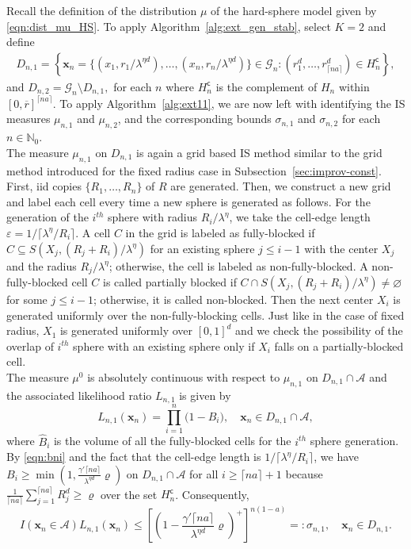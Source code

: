 \documentclass[11pt]{article}
\newcommand{\rbdd}{\overline{r}}
\newcommand{\mbb}{\mathbb}
\newcommand{\lt}{\left}
\newcommand{\rt}{\right}
\newcommand{\wh}{\widehat}
\newcommand{\lfs}{\mathbf{x}}
\begin{document}
Recall the definition of the distribution $\mu$ of the hard-sphere model given by \eqref{eqn:dist_mu_HS}.
To apply Algorithm~\ref{alg:ext_gen_stab}, select $K = 2$ and define
\begin{align*}
 D_{n,1} = \lt\{ \lfs_n = \{(x_1, r_1/\lambda^{\eta d}), \dots, (x_n, r_n/\lambda^{\eta d}) \} \in \mathscr{G}_n: (r_1^d, \dots, r^d_{\lceil n a \rceil}) \in H^{\mathsf{c}}_n\rt\},
\end{align*}
and $D_{n,2} =  {\mathscr{G}}_n\setminus D_{n,1},$
 for each $n$ where $H^{\mathsf{c}}_n$ is the complement of $H_n$ within $[0, \rbdd]^{\lceil n a \rceil}$. To apply Algorithm~\ref{alg:ext11}, we are now left with identifying the IS measures $\mu_{n,1}$ and $\mu_{n,2}$, and the corresponding bounds $\sigma_{n,1}$ and $\sigma_{n,2}$ for each ${n \in \mbb{N}_0}$. \\
 

The measure $\mu_{n,1}$  on $ D_{n,1}$ is again a grid based IS method similar to the grid method introduced for the fixed radius case in Subsection~\ref{sec:improv-const}. First, iid copies $\{R_1, \dots, R_n\}$ of $R$ are generated. Then, we construct a new grid and label each cell every time a new sphere is generated as follows. For the generation of the $i^{th}$ sphere with radius $R_i/\lambda^\eta$, we take the cell-edge length ${\varepsilon = 1/ \lceil \lambda^\eta/R_i\rceil}$. A cell $C$ in the grid is labeled as fully-blocked if ${C \subseteq S(X_j, (R_j + R_i)/\lambda^\eta)}$ for an existing sphere ${j \leq i-1}$ with the center $X_j$ and the radius $R_j/\lambda^\eta$; otherwise, the cell is labeled as non-fully-blocked. A non-fully-blocked cell $C$ is called partially blocked if ${C \cap S(X_j, (R_j + R_i)/\lambda^\eta) \neq \varnothing}$ for some ${j \leq i-1}$; otherwise, it is called non-blocked. Then the next center $X_i$ is generated uniformly over the non-fully-blocking cells. Just like in the case of fixed radius, $X_1$ is generated uniformly over $[0,1]^d$ and we check the possibility of the overlap of $i^{th}$ sphere with an existing sphere only if $X_i$ falls on a partially-blocked cell.\\

       The measure $\mu^0$ is absolutely continuous with respect to $\mu_{n,1}$ on ${D_{n,1} \cap \mathscr{A}}$ and the associated likelihood ratio $L_{n,1}$ is given by  
       $$L_{n,1}(\lfs_n) =  \prod_{i=1}^{n}\Big(1 - B_{i}\Big), \quad \lfs_n \in D_{n,1} \cap \mathscr{A},$$
       where $\wh B_i$ is the volume of all the fully-blocked cells for the $i^{th}$ sphere generation. By \eqref{eqn:bni} and the fact that the cell-edge length is $1/ \lceil \lambda^\eta/R_i\rceil$, we have
       ${B_{i} \geq \min\lt(1, \frac{\gamma' \lceil n a \rceil}{ \lambda^{\eta d}} \varrho\rt)}$ on ${D_{n,1} \cap \mathscr{A}}$ for all ${i \geq \lceil n a \rceil + 1}$ because
       $\frac{1}{\lceil n a \rceil}\sum_{j =1}^{\lceil n a \rceil} R_j^d \geq \varrho$ over the set $H^{\mathsf{c}}_n$. Consequently, 
       \[
       I(\lfs_n \in \mathscr{A}) L_{n,1}(\lfs_n) \leq \lt[\lt(1 - \frac{\gamma' \lceil n a \rceil}{ \lambda^{\eta d}} \varrho \rt)^+\rt]^{n(1 - a)} =: \sigma_{n, 1}, \quad \lfs_n \in D_{n,1}.
       \]
\end{document}

